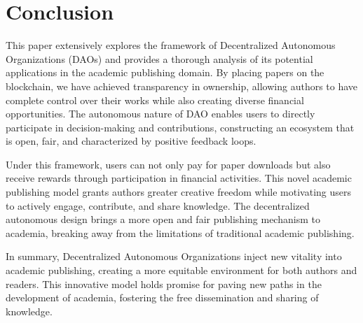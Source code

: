 \documentclass[lettersize,journal]{IEEEtran}
\begin{document}
\section{Conclusion}
This paper extensively explores the framework of Decentralized Autonomous Organizations (DAOs) and provides a thorough analysis of its potential applications in the academic publishing domain. By placing papers on the blockchain, we have achieved transparency in ownership, allowing authors to have complete control over their works while also creating diverse financial opportunities. The autonomous nature of DAO enables users to directly participate in decision-making and contributions, constructing an ecosystem that is open, fair, and characterized by positive feedback loops.

Under this framework, users can not only pay for paper downloads but also receive rewards through participation in financial activities. This novel academic publishing model grants authors greater creative freedom while motivating users to actively engage, contribute, and share knowledge. The decentralized autonomous design brings a more open and fair publishing mechanism to academia, breaking away from the limitations of traditional academic publishing.

In summary, Decentralized Autonomous Organizations inject new vitality into academic publishing, creating a more equitable environment for both authors and readers. This innovative model holds promise for paving new paths in the development of academia, fostering the free dissemination and sharing of knowledge.

\end{document}
